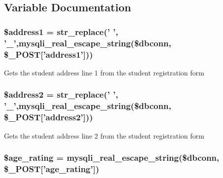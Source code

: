 \subsection{\-Variable \-Documentation}
\hypertarget{user__view_2validate_2studentVal_8php_a653579f1800dead9ae026af236859831}{
\subsubsection[{\$address1}]{\setlength{\rightskip}{0pt plus 5cm}\$address1 = str\-\_\-replace(' ', '\-\_\-',mysqli\-\_\-real\-\_\-escape\-\_\-string(\$dbconn, \$\-\_\-\-P\-O\-S\-T\mbox{[}'address1'\mbox{]}))}}\label{user__view_2validate_2studentVal_8php_a653579f1800dead9ae026af236859831}
\-Gets the student address line 1 from the student registration form \hypertarget{user__view_2validate_2studentVal_8php_a914305af9ec7e49528f07f35a8e8c6a9}{
\subsubsection[{\$address2}]{\setlength{\rightskip}{0pt plus 5cm}\$address2 = str\-\_\-replace(' ', '\-\_\-',mysqli\-\_\-real\-\_\-escape\-\_\-string(\$dbconn, \$\-\_\-\-P\-O\-S\-T\mbox{[}'address2'\mbox{]}))}}\label{user__view_2validate_2studentVal_8php_a914305af9ec7e49528f07f35a8e8c6a9}
\-Gets the student address line 2 from the student registration form \hypertarget{user__view_2validate_2studentVal_8php_a69122fb82424ff3bb0780b56f8bc8e6d}{
\subsubsection[{\$age\-\_\-rating}]{\setlength{\rightskip}{0pt plus 5cm}\$age\-\_\-rating = mysqli\-\_\-real\-\_\-escape\-\_\-string(\$dbconn, \$\-\_\-\-P\-O\-S\-T\mbox{[}'age\-\_\-rating'\mbox{]})}}\label{user__view_2validate_2studentVal_8php_a69122fb82424ff3bb0780b56f8bc8e6d}
